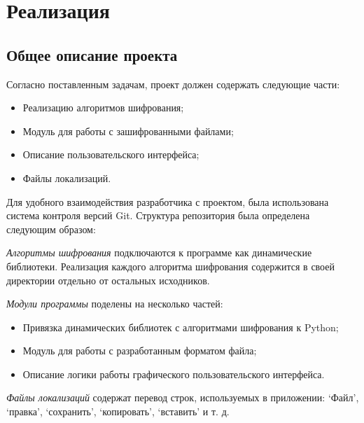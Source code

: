 \newpage
\section{Реализация}\label{sec:razd3}


\subsection{Общее описание проекта} %

Согласно поставленным задачам, проект должен содержать следующие части:
\begin{itemize}
  \item Реализацию алгоритмов шифрования;
  \item Модуль для работы с зашифрованными файлами;
  \item Описание пользовательского интерфейса;
  \item Файлы локализаций.
\end{itemize}

Для удобного взаимодействия разработчика с проектом,
была использована система контроля версий Git.
Структура репозитория была определена следующим образом:



\emph{Алгоритмы шифрования} подключаются к программе как динамические
библиотеки. Реализация каждого алгоритма шифрования содержится в своей
директории отдельно от остальных исходников.

\emph{Модули программы} поделены на несколько частей:
\begin{itemize}
    \item Привязка динамических библиотек с алгоритмами шифрования к Python;
    \item Модуль для работы с разработанным форматом файла;
    \item Описание логики работы графического пользовательского интерфейса.
\end{itemize}

\emph{Файлы локализаций} содержат перевод строк, используемых в приложении:
`Файл', `правка', `сохранить', `копировать', `вставить' и т. д.

